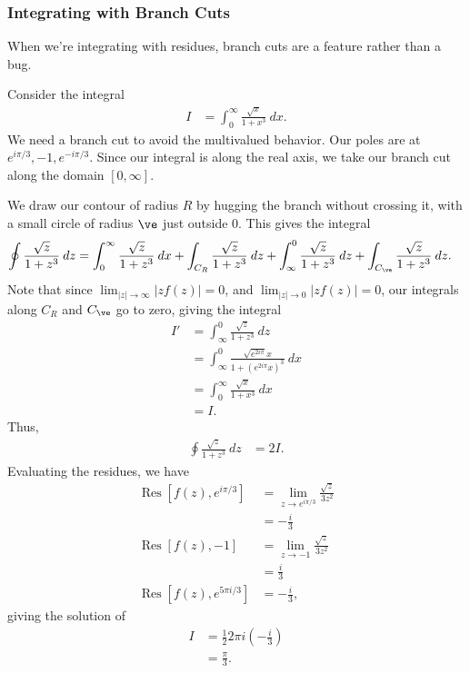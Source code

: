 \documentclass[10pt]{mypackage}
\DeclareMathOperator{\res}{Res}
\begin{document}
   \subsubsection{Integrating with Branch Cuts}%
   When we're integrating with residues, branch cuts are a feature rather than a bug.
   \begin{example}
     Consider the integral
     \begin{align*}
       I &= \int_{0}^{\infty} \frac{\sqrt{x}}{1 + x^3}\:dx.
     \end{align*}
     We need a branch cut to avoid the multivalued behavior. Our poles are at $e^{i\pi/3},-1,e^{-i\pi/3}$. Since our integral is along the real axis, we take our branch cut along the domain $[0,\infty]$.\newline

     We draw our contour of radius $R$ by hugging the branch without crossing it, with a small circle of radius $\ve$ just outside $0$. This gives the integral
     \begin{align*}
       \oint \frac{\sqrt{z}}{1 + z^3}\:dz &= \int_{0}^{\infty} \frac{\sqrt{z}}{1 + z^3}\:dx + \int_{C_R}^{} \frac{\sqrt{z}}{1 + z^3}\:dz + \int_{\infty}^{0} \frac{\sqrt{z}}{1 + z^3}\:dz + \int_{C_{\ve}}^{} \frac{\sqrt{z}}{1 + z^3}\:dz.
     \end{align*}
     Note that since $\lim_{|z|\rightarrow\infty}\left\vert zf(z) \right\vert = 0$, and $\lim_{|z|\rightarrow 0}\left\vert zf(z) \right\vert = 0$, our integrals along $C_R$ and $C_{\ve}$ go to zero, giving the integral
     \begin{align*}
       I' &= \int_{\infty}^{0} \frac{\sqrt{z}}{1 + z^3}\:dz\\
          &= \int_{\infty}^{0} \frac{\sqrt{e^{2i\pi }}x}{1 +\left( e^{2i\pi}x \right)^3}\:dx\\
          &= \int_{0}^{\infty} \frac{\sqrt{x}}{1 + x^3}\:dx\\
          &= I.
     \end{align*}
     Thus,
     \begin{align*}
       \oint \frac{\sqrt{z}}{1 + z^3}\:dz &= 2I.
     \end{align*}
     Evaluating the residues, we have
     \begin{align*}
       \res\left[ f(z),e^{i\pi/3} \right] &= \lim_{z\rightarrow e^{i\pi/3}}\frac{\sqrt{z}}{3z^2}\\
                                          &= -\frac{i}{3}\\
       \res\left[ f(z),-1 \right] &= \lim_{z\rightarrow-1} \frac{\sqrt{z}}{3z^2}\\
                                  &= \frac{i}{3}\\
       \res\left[ f(z),e^{5\pi i/3} \right] &= -\frac{i}{3},
     \end{align*}
     giving the solution of
     \begin{align*}
       I &= \frac{1}{2}2\pi i\left( -\frac{i}{3} \right)\\
         &= \frac{\pi}{3}.
     \end{align*}
   \end{example}
\end{document}
